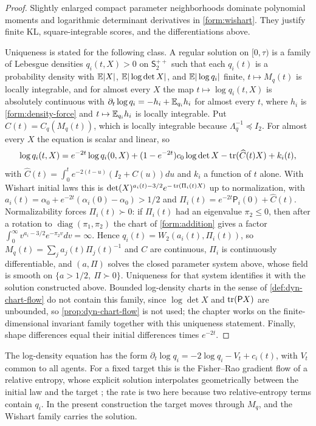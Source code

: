 \begin{proof}
Slightly enlarged compact parameter neighborhoods dominate polynomial moments
and logarithmic determinant derivatives in \cref{form:wishart}. They justify
finite KL, square-integrable scores, and the differentiations above.

Uniqueness is stated for the following class. A regular solution on $[0,\tau)$ is a family of Lebesgue densities $q_i(t,X)>0$ on $\mathsf S^{++}_2$ such that each $q_i(t)$ is a probability density with $\mathbb E|X|$, $\mathbb E|\log\det X|$, and $\mathbb E|\log q_i|$ finite, $t\mapsto M_q(t)$ is locally integrable, and for almost every $X$ the map $t\mapsto\log q_i(t,X)$ is absolutely continuous with $\partial_t\log q_i=-h_i+\mathbb E_{q_i}h_i$ for almost every $t$, where $h_i$ is \cref{form:density-force} and $t\mapsto\mathbb E_{q_i}h_i$ is locally integrable. Put $C(t)=C_q(M_q(t))$, which is locally integrable because $\Lambda_q^{-1}\preceq I_2$. For almost every $X$ the equation is scalar and linear, so
\begin{equation*}
 \log q_i(t,X)=e^{-2t}\log q_i(0,X)+(1-e^{-2t})c_0\log\det X-\operatorname{tr}(\widehat C(t)X)+k_i(t),
\end{equation*}
with $\widehat C(t)=\int_0^te^{-2(t-u)}(I_2+C(u))du$ and $k_i$ a function of $t$ alone. With Wishart initial laws this is $\det(X)^{a_i(t)-3/2}e^{-\operatorname{tr}(\Pi_i(t)X)}$ up to normalization, with $a_i(t)=\alpha_0+e^{-2t}(\alpha_i(0)-\alpha_0)>1/2$ and $\Pi_i(t)=e^{-2t}\mathsf P_i(0)+\widehat C(t)$. Normalizability forces $\Pi_i(t)\succ0$: if $\Pi_i(t)$ had an eigenvalue $\pi_2\le0$, then after a rotation to $\operatorname{diag}(\pi_1,\pi_2)$ the chart of \cref{form:addition} gives a factor $\int_0^\infty v^{a_i-3/2}e^{-\pi_2v}dv=\infty$. Hence $q_i(t)=W_2(a_i(t),\Pi_i(t))$, so $M_q(t)=\sum_ja_j(t)\Pi_j(t)^{-1}$ and $C$ are continuous, $\Pi_i$ is continuously differentiable, and $(a,\Pi)$ solves the closed parameter system above, whose field is smooth on $\{a>1/2,\ \Pi\succ0\}$. Uniqueness for that system identifies it with the solution constructed above. Bounded log-density charts in the sense of \cref{def:dyn-chart-flow} do not contain this family, since $\log\det X$ and $\operatorname{tr}(\mathsf PX)$ are unbounded, so \cref{prop:dyn-chart-flow} is not used; the chapter works on the finite-dimensional invariant family together with this uniqueness statement.
Finally, shape differences equal their initial differences times $e^{-2t}$.
\end{proof}

The log-density equation has the form $\partial_t\log q_i=-2\log q_i-V_t+c_i(t)$, with $V_t$ common to all agents. For a fixed target this is the Fisher--Rao gradient flow of a relative entropy, whose explicit solution interpolates geometrically between the initial law and the target \citep[Appendix B]{ChenEtAl2023}; the rate is two here because two relative-entropy terms contain $q_i$. In the present construction the target moves through $M_q$, and the Wishart family carries the solution.

